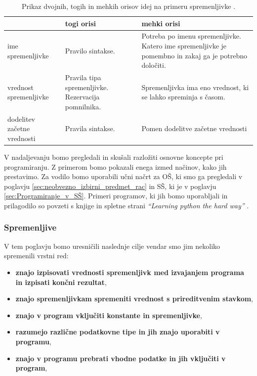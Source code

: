 \begin{table}[!h]

\caption{Prikaz dvojnih, togih in mehkih orisov idej na primeru
  spremenljivke \cite{guideTCS}. }
\label{tab:koncept_spremenljivka}
\begin{tabular}{
  | p{} |
  p{} |
  p{} | }
  \hline
  \rowcolor{sbase00!100}
  & \textbf{togi orisi} & \textbf{mehki orisi}\\
  \hline
  ime spremenljivke & Pravilo sintakse. & Potreba po imenu
                                          spremenljivke. Katero ime
                                          spremenljivke je pomembno in
                                          zakaj ga je potrebno
                                          določiti.\\
  \hline
  vrednost spremenljivke & Pravila tipa spremenljivke. Rezervacija
                           pomnilnika. & Spremenljivka ima eno
                                         vrednost, ki se lahko
                                         spreminja s časom.\\
  \hline
  dodelitev začetne vrednosti & Pravila sintakse. & Pomen dodelitve
                                                  začetne vrednosti\\
  \hline

\end{tabular}
\end{table}

V nadaljevanju bomo pregledali in skušali razložiti osnovne koncepte
pri programiranju. Z primerom bomo pokazali enega izmed načinov, kako
jih prestavimo. Za vodilo bomo uporabili učni načrt za OŠ, ki smo ga
pregledali v poglavju \ref{sec:neobvezno_izbirni_predmet_rac} in SŠ,
ki je v poglavju \ref{sec:Programiranje_v_SŠ}. Primeri programov, ki
jih bomo uporabljali in prilagodilo so povzeti s knjige in spletne
strani \emph{``Learning python the hard way''} \cite{web:PTHardWay}.



\subsubsection{Spremenljive}
\label{sec:spremenljivke}

V tem poglavju bomo uresničili naslednje cilje vendar smo jim nekoliko
spremenili vrstni red:
\begin{itemize}
\tightlist
\item \textbf{znajo izpisovati vrednosti spremenljivk med izvajanjem programa
  in izpisati končni rezultat},
\item \textbf{znajo spremenljivkam spremeniti vrednost s prireditvenim
  stavkom},
\item \textbf{znajo v program vključiti konstante in spremenljivke},
\item \textbf{ razumejo različne podatkovne tipe in jih znajo uporabiti v
  programu},
\item \textbf{znajo v programu prebrati vhodne podatke in jih vključiti v
  program},
\end{itemize}


